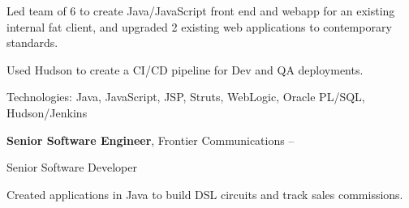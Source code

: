 \documentclass[MMMMyyyy,nonstopmode]{simpleresumecv_stacked}
\newcommand{\tech}[1]{\Gap\textrm{Technologies:} #1}
\newcommand{\comment}[1]{\ignorespaces} %
\newif\ifLOCATION
\newif\ifLONG
\newif\ifNOTSELECTED
\begin{document}
\begin{Body}

\ifNOTSELECTED
\Entry
\textbf{Lead Software Engineer, Paychex}
\hfill

\begin{Detail}
Led team of 6 to create three public-facing fullstack applications in Java and JavaScript.
\end{Detail}

\ifLONG

\Entry
\href{http://www.paychex.com/}
{\textbf{Paychex}}
\hfill 
\DatestampY{2005} -- \DatestampY{2010}

Lead Developer
\ifLOCATION
\hfill
Rochester, New York
\fi

\begin{Detail}
Led team of 6 to create Java/JavaScript front end and webapp for an existing internal fat client, and upgraded 2 existing web applications to contemporary standards. 

Used Hudson to create a CI/CD pipeline for Dev and QA deployments.

\iffalse
\BulletItem
Member of architecture team to research and set five-year strategy for web application strategy.
\fi

\tech{Java, JavaScript, JSP, Struts, WebLogic, Oracle PL/SQL, Hudson/Jenkins}
\end{Detail}
\fi %

\Entry
\textbf{Senior Software Engineer}, Frontier Communications
\hfill 
 -- 

Senior Software Developer
\ifLOCATION
\hfill
Rochester, New York
\fi

\begin{Detail}
Created applications in Java to build DSL circuits and track sales commissions.


\end{Detail}


\end{Body}
\end{document}
